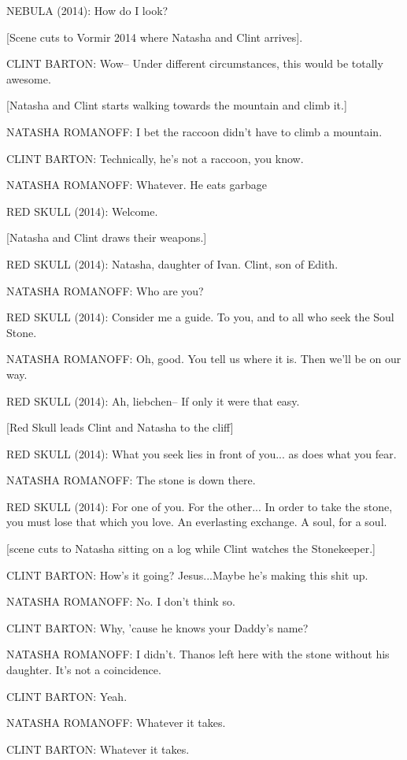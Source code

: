 NEBULA (2014): How do I look?

[Scene cuts to Vormir 2014 where Natasha and Clint arrives].

CLINT BARTON: Wow– Under different circumstances, this would be totally awesome.

[Natasha and Clint starts walking towards the mountain and climb it.]

NATASHA ROMANOFF: I bet the raccoon didn't have to climb a mountain.

CLINT BARTON: Technically, he's not a raccoon, you know.

NATASHA ROMANOFF: Whatever. He eats garbage

RED SKULL (2014): Welcome.

[Natasha and Clint draws their weapons.]

RED SKULL (2014): Natasha, daughter of Ivan. Clint, son of Edith.

NATASHA ROMANOFF: Who are you?

RED SKULL (2014): Consider me a guide. To you, and to all who seek the Soul Stone.

NATASHA ROMANOFF: Oh, good. You tell us where it is. Then we'll be on our way.

RED SKULL (2014): Ah, liebchen– If only it were that easy.

[Red Skull leads Clint and Natasha to the cliff]

RED SKULL (2014): What you seek lies in front of you... as does what you fear.

NATASHA ROMANOFF: The stone is down there.

RED SKULL (2014): For one of you. For the other... In order to take the stone, you must lose that which you love. An everlasting exchange. A soul, for a soul.

[scene cuts to Natasha sitting on a log while Clint watches the Stonekeeper.]

CLINT BARTON: How's it going? Jesus...Maybe he's making this shit up.

NATASHA ROMANOFF: No. I don't think so.

CLINT BARTON: Why, 'cause he knows your Daddy's name?

NATASHA ROMANOFF: I didn't. Thanos left here with the stone without his daughter. It's not a coincidence.

CLINT BARTON: Yeah.

NATASHA ROMANOFF: Whatever it takes.

CLINT BARTON: Whatever it takes.

